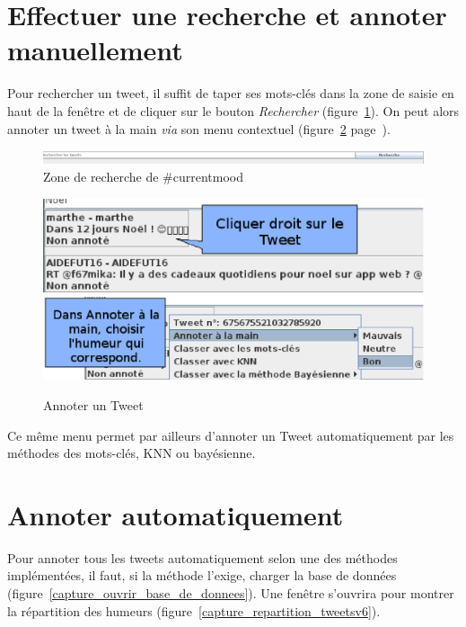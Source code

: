 \documentclass[12pt,a4paper]{report}
\newcommand{\CMName}{\#currentmood}
\begin{document}
\newpage
\section{Effectuer une recherche  et annoter manuellement}
Pour rechercher un tweet, il suffit de taper ses mots-clés dans la zone de
saisie en haut de la fenêtre et de cliquer sur le bouton \textit{Rechercher}
(figure~\ref{capture_recherchertweet}).
On peut alors annoter un tweet à la main \textit{via} son menu contextuel
(figure~\ref{capture_annotertweet} page~\pageref{capture_annotertweet}).

\begin{figure}
	\centering
	\includegraphics[width=\textwidth]{img/chercheruntweet.png}
	\caption{Zone de recherche de \CMName}
	\label{capture_recherchertweet}
\end{figure}


\begin{figure}
	\centering
	\includegraphics[width=\textwidth]{img/capture_annotertweet1.eps}
	\includegraphics[width=\textwidth]{img/capture_annotertweet2.eps}
	\caption{Annoter un Tweet}
	\label{capture_annotertweet}
\end{figure}

Ce même menu permet par ailleurs d'annoter un Tweet automatiquement par les
méthodes des mots-clés, KNN ou bayésienne.

\section{Annoter automatiquement}
Pour annoter tous les tweets automatiquement selon une des méthodes
implémentées, il faut, si la méthode l'exige, charger la base de données
(figure~\ref{capture_ouvrir_base_de_donnees}). Une fenêtre s'ouvrira pour
montrer la répartition des humeurs (figure~\ref{capture_repartition_tweetsv6}).
\end{document}

